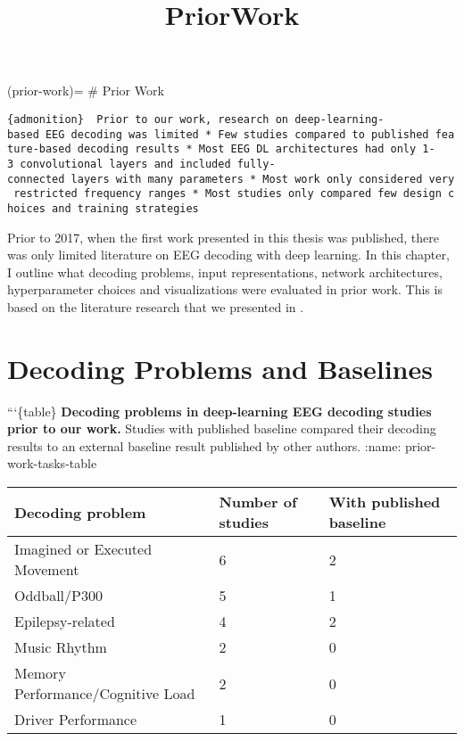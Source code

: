\documentclass[11pt]{article}
\title{PriorWork}
\begin{document}
    
    \maketitle
    
    

    
    (prior-work)= \# Prior Work

    \texttt{\{admonition\}\ \ Prior\ to\ our\ work,\ research\ on\ deep-learning-based\ EEG\ decoding\ was\ limited\ *\ Few\ studies\ compared\ to\ published\ feature-based\ decoding\ results\ *\ Most\ EEG\ DL\ architectures\ had\ only\ 1-3\ convolutional\ layers\ and\ included\ fully-connected\ layers\ with\ many\ parameters\ *\ Most\ work\ only\ considered\ very\ restricted\ frequency\ ranges\ *\ Most\ studies\ only\ compared\ few\ design\ choices\ and\ training\ strategies}

    Prior to 2017, when the first work presented in this thesis was
published, there was only limited literature on EEG decoding with deep
learning. In this chapter, I outline what decoding problems, input
representations, network architectures, hyperparameter choices and
visualizations were evaluated in prior work. This is based on the
literature research that we presented in
\citet{schirrmeisterdeephbm2017}.

    \hypertarget{decoding-problems-and-baselines}{%
\section{Decoding Problems and
Baselines}\label{decoding-problems-and-baselines}}

    ```\{table\} \textbf{Decoding problems in deep-learning EEG decoding
studies prior to our work.} Studies with published baseline compared
their decoding results to an external baseline result published by other
authors. :name: prior-work-tasks-table

\begin{longtable}[]{@{}lll@{}}
\toprule
Decoding problem & Number of studies & With published baseline \\
\midrule
\endhead
Imagined or Executed Movement & 6 & 2 \\
Oddball/P300 & 5 & 1 \\
Epilepsy-related & 4 & 2 \\
Music Rhythm & 2 & 0 \\
Memory Performance/Cognitive Load & 2 & 0 \\
Driver Performance & 1 & 0 \\
\bottomrule
\end{longtable}
\end{document}
